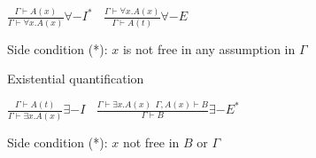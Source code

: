 		\enumstart
			\item $\frac{\Gamma \vdash A(x)}{\Gamma \vdash \forall x.A(x)}\forall-I^* \ \ \ \ \frac{\Gamma \vdash \forall x.A(x)}{\Gamma \vdash A(t)}\forall-E$
			\item Side condition (*): $x$ is not free in any assumption in $\Gamma$
		\enumend
		\item Existential quantification
		\enumstart
			\item $\frac{\Gamma \vdash A(t)}{\Gamma \vdash \exists x.A(x)}\exists-I \ \ \ \ \frac{\Gamma \vdash \exists x.A(x) \ \ \Gamma, A(x) \vdash B}{\Gamma \vdash B}\exists-E^*$
			\item Side condition (*): $x$ not free in $B$ or $\Gamma$
		\enumend
	\enumend
\enumend
